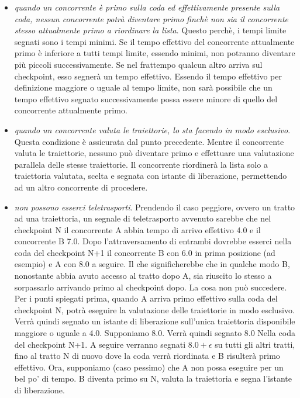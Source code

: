 \begin{itemize}
\item \emph{quando un concorrente \`{e} primo sulla coda ed effettivamente presente sulla coda, nessun concorrente potr\`{a} diventare primo finch\`{e} non sia il concorrente
stesso attualmente primo a riordinare la lista}. Questo perch\`{e}, i tempi limite segnati sono i tempi minimi. Se il tempo effettivo del concorrente attualmente
primo \`{e} inferiore a tutti tempi limite, essendo minimi, non potranno diventare pi\`{u} piccoli successivamente. Se nel frattempo qualcun altro arriva sul 
checkpoint, esso segner\`{a} un tempo effettivo. Essendo il tempo effettivo per definizione maggiore o uguale al tempo limite, non sar\`{a} possibile che un tempo
effettivo segnato successivamente possa essere minore di quello del concorrente attualmente primo.
\item \emph{quando un concorrente valuta le traiettorie, lo sta facendo in modo esclusivo}. Questa condizione \`{e} assicurata dal punto precedente. Mentre il 
concorrente valuta le traiettorie, nessuno pu\`{o} diventare primo e effettuare una valutazione parallela delle stesse traiettorie. Il concorrente riordiner\`{a}
la lista solo a traiettoria valutata, scelta e segnata con istante di liberazione, permettendo ad un altro concorrente di procedere.
\item \emph{non possono esserci teletrasporti}. Prendendo il caso peggiore, ovvero un tratto ad una traiettoria, un segnale di teletrasporto avvenuto sarebbe
che nel checkpoint N il concorrente A abbia tempo di arrivo effettivo 4.0 e il concorrente B 7.0. Dopo l'attraversamento di entrambi dovrebbe esserci nella 
coda del checkpoint N+1 il concorrente B con 6.0 in prima posizione (ad esempio) e A con 8.0 a seguire. Il che significherebbe che in qualche modo B, nonostante
abbia avuto accesso al tratto dopo A, sia riuscito lo stesso a sorpassarlo arrivando primo al checkpoint dopo. La cosa non pu\`{o} succedere. Per i punti spiegati
prima, quando A arriva primo effettivo sulla coda del checkpoint N, potr\`{a} eseguire la valutazione delle traiettorie in modo esclusivo. Verr\`{a} quindi segnato
un istante di liberazione sull'unica traiettoria disponibile maggiore o uguale a 4.0. Supponiamo 8.0. Verr\`{a} quindi segnato 8.0 Nella coda del checkpoint N+1. A
seguire verranno segnati $8.0+\epsilon$ su tutti gli altri tratti, fino al tratto N di nuovo dove la coda verr\`{a} riordinata e B risulter\`{a} primo effettivo.
Ora, supponiamo (caso pessimo) che A non possa eseguire per un bel po' di tempo. B diventa primo su N, valuta la traiettoria e segna l'istante di liberazione.

\end{itemize}
